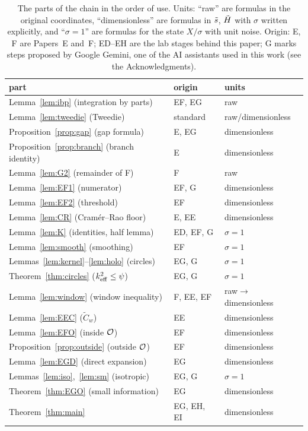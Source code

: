 \begin{table}[t]
\caption{The parts of the chain in the order of use. Units: ``raw'' are formulas in the original coordinates, ``dimensionless'' are formulas in $\tilde s$, $\tilde H$ with $\sigma$ written explicitly, and ``$\sigma=1$'' are formulas for the state $X/\sigma$ with unit noise. Origin: E, F are Papers~E and~F; ED--EH are the lab stages behind this paper; G marks steps proposed by Google Gemini, one of the AI assistants used in this work (see the Acknowledgments).}
\label{tab:chain}
\begin{ruledtabular}
\begin{tabular}{lll}
part & origin & units\\
\hline
Lemma~\ref{lem:ibp} (integration by parts) & EF, EG & raw\\
Lemma~\ref{lem:tweedie} (Tweedie) & standard~\cite{Efron,Robbins} & raw/dimensionless\\
Proposition~\ref{prop:gap} (gap formula) & E, EG & dimensionless\\
Proposition~\ref{prop:branch} (branch identity) & E & dimensionless\\
Lemma~\ref{lem:G2} (remainder of F) & F & raw\\
Lemma~\ref{lem:EF1} (numerator) & EF, G & dimensionless\\
Lemma~\ref{lem:EF2} (threshold) & EF & dimensionless\\
Lemma~\ref{lem:CR} (Cram\'er--Rao floor) & E, EE & dimensionless\\
Lemma~\ref{lem:K} (identities, half lemma) & ED, EF, G & $\sigma=1$\\
Lemma~\ref{lem:smooth} (smoothing) & EF & $\sigma=1$\\
Lemmas~\ref{lem:kernel}--\ref{lem:holo} (circles) & EG, G & $\sigma=1$\\
Theorem~\ref{thm:circles} ($k_{\mathrm{eff}}^2\le\psi$) & EG, G & $\sigma=1$\\
Lemma~\ref{lem:window} (window inequality) & F, EE, EF & raw$\to$dimensionless\\
Lemma~\ref{lem:EEC} ($\tilde C_w$) & EE & dimensionless\\
Lemma~\ref{lem:EFO} (inside $\mathcal O$) & EF & dimensionless\\
Proposition~\ref{prop:outside} (outside $\mathcal O$) & EF & dimensionless\\
Lemma~\ref{lem:EGD} (direct expansion) & EG & dimensionless\\
Lemmas~\ref{lem:iso},~\ref{lem:sm} (isotropic) & EG, G & $\sigma=1$\\
Theorem~\ref{thm:EGO} (small information) & EG & dimensionless\\
Theorem~\ref{thm:main} & EG, EH, EI & dimensionless
\end{tabular}
\end{ruledtabular}
\end{table}

